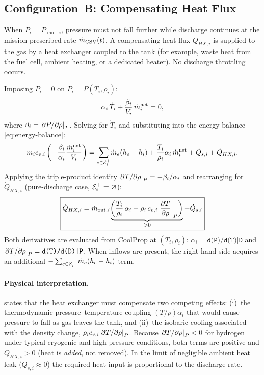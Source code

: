 \subsection{Configuration~B: Compensating Heat Flux}
\label{sec:dae:configB}

When $P_i = P_{\min,i}$, pressure must not fall further while discharge
continues at the mission-prescribed rate $\dot{m}_\text{CSV}(t)$.  A compensating
heat flux $\dot{Q}_{HX,i}$ is supplied to the gas by a heat exchanger coupled
to the tank (for example, waste heat from the fuel cell, ambient heating, or a
dedicated heater).  No discharge throttling occurs.

Imposing $\dot{P}_i = 0$ on $P_i = P(T_i, \rho_i)$:
\begin{equation}
  \alpha_i\,\dot{T}_i + \frac{\beta_i}{V_i}\,\dot{m}_i^{\text{net}} = 0,
  \label{eq:config-b-constraint}
\end{equation}
where $\beta_i = \left.\partial P/\partial\rho\right|_{T}$.  Solving for $\dot{T}_i$
and substituting into the energy balance \cref{eq:energy-balance}:
\begin{equation}
  m_i c_{v,i}
    \left(-\frac{\beta_i}{\alpha_i}\frac{\dot{m}_i^{\text{net}}}{V_i}\right)
  = \sum_{e\in\mathcal{E}_i^+}\!\dot{m}_e(h_e - h_i)
    + \frac{T_i}{\rho_i}\alpha_i\,\dot{m}_i^{\text{net}}
    + \dot{Q}_{s,i} + \dot{Q}_{HX,i}.
  \label{eq:config-b-energy}
\end{equation}
Applying the triple-product identity
$\left.\partial T/\partial\rho\right|_{P} = -\beta_i/\alpha_i$ and rearranging for
$\dot{Q}_{HX,i}$ (pure-discharge case, $\mathcal{E}_i^+ = \varnothing$):
\begin{equation}
  \boxed{
  \dot{Q}_{HX,i} = \dot{m}_{\text{out},i}
    \underbrace{\!\left(
      \frac{T_i}{\rho_i}\,\alpha_i
      - \rho_i\,c_{v,i}\left.\frac{\partial T}{\partial\rho}\right|_{P}
    \right)}_{>0}
    - \dot{Q}_{s,i}
  }
  \label{eq:config-b-qhx}
\end{equation}
Both derivatives are evaluated from CoolProp at $(T_i, \rho_i)$:
$\alpha_i = \texttt{d(P)/d(T)|D}$ and
$\left.\partial T/\partial\rho\right|_{P} = \texttt{d(T)/d(D)|P}$.
When inflows are present, the right-hand side acquires an additional
$-\sum_{e\in\mathcal{E}_i^+}\dot{m}_e(h_e - h_i)$ term.

\paragraph{Physical interpretation.}
 states that the heat exchanger must compensate two
competing effects: (i)~the thermodynamic pressure--temperature coupling
$(T/\rho)\alpha_i$ that would cause pressure to fall as gas leaves the tank, and
(ii)~the isobaric cooling associated with the density change,
$\rho_i c_{v,i}\left.\partial T/\partial\rho\right|_{P}$.  Because
$\left.\partial T/\partial\rho\right|_{P} < 0$ for hydrogen under typical cryogenic
and high-pressure conditions, both terms are positive and $\dot{Q}_{HX,i} > 0$
(heat is \emph{added}, not removed).  In the limit of negligible ambient heat
leak ($\dot{Q}_{s,i} \approx 0$) the required heat input is proportional to the
discharge rate.


